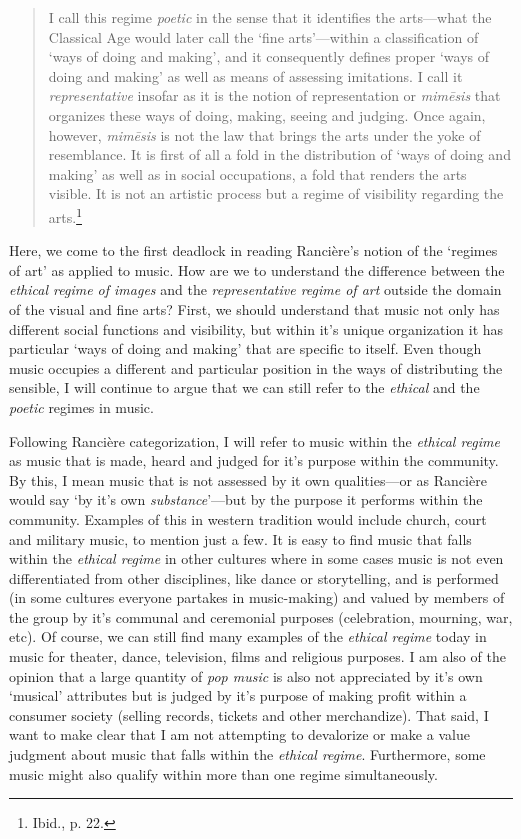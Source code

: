 \begin{quote}
I call this regime \emph{poetic} in the sense that it identifies the arts---what the Classical Age would later call the `fine arts'---within a classification of `ways of doing and making', and it consequently defines proper `ways of doing and making' as well as means of assessing imitations. I call it \emph{representative} insofar as it is the notion of representation or \emph{mim\={e}sis} that organizes these ways of doing, making, seeing and judging. Once again, however, \emph{mim\={e}sis} is not the law that brings the arts under the yoke of resemblance. It is first of all a fold in the distribution of `ways of doing and making' as well as in social occupations, a fold that renders the arts visible. It is not an artistic process but a regime of visibility regarding the arts.\footnote{Ibid., p. 22.}
\end{quote}

Here, we come to the first deadlock in reading Ranci\`{e}re's notion of the `regimes of art' as applied to music. How are we to understand the difference between the \emph{ethical regime of images} and the \emph{representative regime of art} outside the domain of the visual and fine arts? First, we should understand that music not only has different social functions and visibility, but within it's unique organization it has particular `ways of doing and making' that are specific to itself. Even though music occupies a different and particular position in the ways of distributing the sensible, I will continue to argue that we can still refer to the \emph{ethical} and the \emph{poetic} regimes in music. 

Following Ranci\`{e}re categorization, I will refer to music within the \emph{ethical regime} as music that is made, heard and judged for it's purpose within the community. By this, I mean music that is not assessed by it own qualities---or as Ranci\`{e}re would say `by it's own \emph{substance}'---but by the purpose it performs within the community. Examples of this in western tradition would include church, court and military music, to mention just a few. It is easy to find music that falls within the \emph{ethical regime} in other cultures where in some cases music is not even differentiated from other disciplines, like dance or storytelling, and is performed (in some cultures everyone partakes in music-making) and valued by members of the group by it's communal and ceremonial purposes (celebration, mourning, war, etc). Of course, we can still find many examples of the \emph{ethical regime} today in music for theater, dance, television, films and religious purposes. I am also of the opinion that a large quantity of \emph{pop music} is also not appreciated by it's own `musical' attributes but is judged by it's purpose of making profit within a consumer society (selling records, tickets and other merchandize). That said, I want to make clear that I am not attempting to devalorize or make a value judgment about music that falls within the \emph{ethical regime}. Furthermore, some music might also qualify within more than one regime simultaneously.

